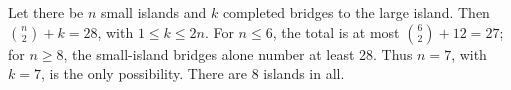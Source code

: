 Let there be $n$ small islands and $k$ completed bridges to the large island. Then $\binom n2+k=28$, with $1\le k\le2n$. For $n\le6$, the total is at most $\binom62+12=27$; for $n\ge8$, the small-island bridges alone number at least 28. Thus $n=7$, with $k=7$, is the only possibility. There are $\boxed8$ islands in all.
